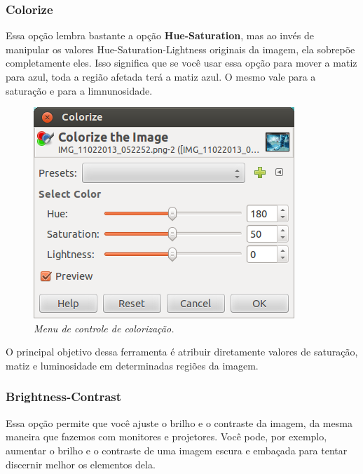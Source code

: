 \documentclass[12pt,onecolumn]{article}
\begin{document}
      \subsubsection{Colorize}
        Essa opção lembra bastante a opção \textbf{Hue-Saturation}, mas ao invés
        de manipular os valores Hue-Saturation-Lightness originais da imagem,
        ela sobrepõe completamente eles. Isso significa que se você usar essa
        opção para mover a matiz para azul, toda a região afetada terá a matiz
        azul. O mesmo vale para a saturação e para a limnunosidade.
        
        \begin{figure}[H]
          \centering
          \includegraphics[width=.6\linewidth]{screenshots/10-colorize.png}
          \caption{
            \footnotesize
            \it
            Menu de controle de colorização.
          }
          \label{fig:colorize}
        \end{figure}
        
        O principal objetivo dessa ferramenta é atribuir diretamente valores de
        saturação, matiz e luminosidade em determinadas regiões da imagem.
      
      \subsubsection{Brightness-Contrast}
        Essa opção permite que você ajuste o brilho e o contraste da imagem, da
        mesma maneira que fazemos com monitores e projetores. Você pode, por
        exemplo, aumentar o brilho e o contraste de uma imagem escura e embaçada
        para tentar discernir melhor os elementos dela.
        
\end{document}
